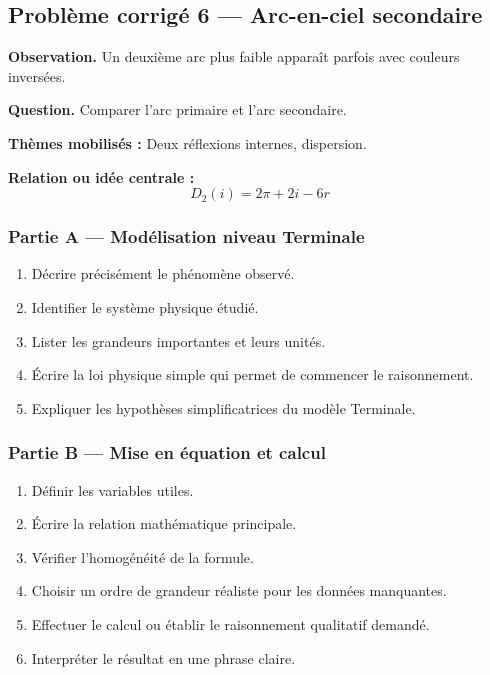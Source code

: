 \documentclass[11pt,a4paper]{article}
\begin{document}
\subsection{Problème corrigé 6 — Arc-en-ciel secondaire}

\begin{exercicebox}
\textbf{Observation.} Un deuxième arc plus faible apparaît parfois avec couleurs inversées.

\medskip
\textbf{Question.} Comparer l'arc primaire et l'arc secondaire.

\medskip
\textbf{Thèmes mobilisés :} Deux réflexions internes, dispersion.

\medskip
\textbf{Relation ou idée centrale :}
\[
D_2(i)=2\pi+2i-6r
\]
\end{exercicebox}

\subsubsection*{Partie A — Modélisation niveau Terminale}

\begin{enumerate}
  \item Décrire précisément le phénomène observé.
  \item Identifier le système physique étudié.
  \item Lister les grandeurs importantes et leurs unités.
  \item Écrire la loi physique simple qui permet de commencer le raisonnement.
  \item Expliquer les hypothèses simplificatrices du modèle Terminale.
\end{enumerate}

\subsubsection*{Partie B — Mise en équation et calcul}

\begin{enumerate}
  \item Définir les variables utiles.
  \item Écrire la relation mathématique principale.
  \item Vérifier l'homogénéité de la formule.
  \item Choisir un ordre de grandeur réaliste pour les données manquantes.
  \item Effectuer le calcul ou établir le raisonnement qualitatif demandé.
  \item Interpréter le résultat en une phrase claire.
\end{enumerate}
\end{document}
